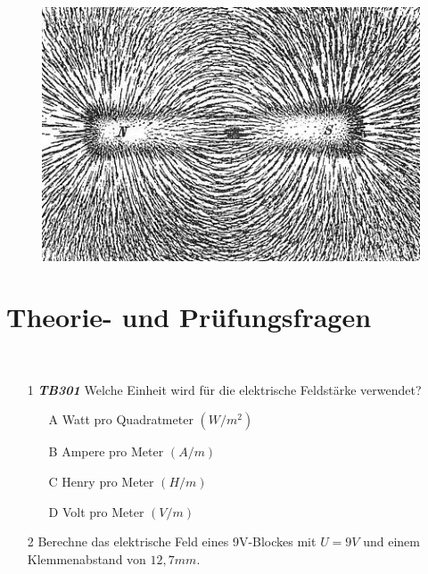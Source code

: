 \begin{figure}
 \vspace{-7.5cm}
  \includegraphics[scale=0.35]{Felder/Bilder/Magnet.jpg}
 \vspace{-7.5cm}
\end{figure}

\section{Theorie- und Prüfungsfragen}

~~~~~~


\begin{enumerate} 
\itemsep1pt\parskip0pt
\item[1] \emph{\textbf{TB301}} Welche Einheit wird für die elektrische Feldstärke verwendet?
	\begin{enumerate}
	\itemsep1pt\parskip0pt
		\item[A] Watt pro Quadratmeter $(W/m^2)$
		\item[B] Ampere pro Meter $(A/m)$
		\item[C] Henry pro Meter $(H/m)$
		\item[D] Volt pro Meter $(V/m)$
	\end{enumerate}
\end{enumerate}

\begin{enumerate} 
\itemsep1pt\parskip0pt
\item[2] Berechne das elektrische Feld eines 9V-Blockes mit $U = 9V$ und einem Klemmenabstand von $12,7mm$.
\end{enumerate}

